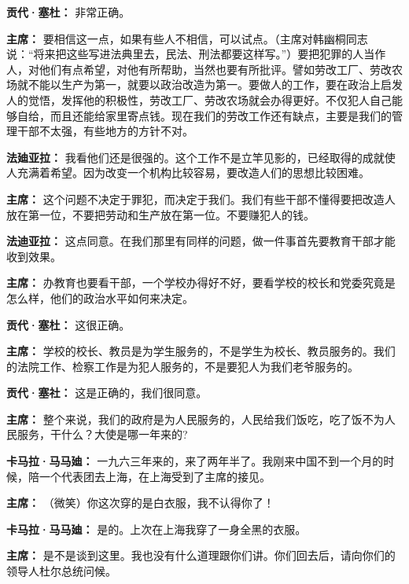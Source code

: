 \begin{duihua}
\item[\textbf{贡代·塞杜：}] 非常正确。

\item[\textbf{主席：}] 要相信这一点，如果有些人不相信，可以试点。（主席对韩幽桐同志说：“将来把这些写进法典里去，民法、刑法都要这样写。”）要把犯罪的人当作人，对他们有点希望，对他有所帮助，当然也要有所批评。譬如劳改工厂、劳改农场就不能以生产为第一，就要以政治改造为第一。要做人的工作，要在政治上启发人的觉悟，发挥他的积极性，劳改工厂、劳改农场就会办得更好。不仅犯人自己能够自给，而且还能给家里寄点钱。现在我们的劳改工作还有缺点，主要是我们的管理干部不太强，有些地方的方针不对。

\item[\textbf{法廸亚拉：}] 我看他们还是很强的。这个工作不是立竿见影的，已经取得的成就使人充满着希望。因为改变一个机构比较容易，要改造人们的思想比较困难。

\item[\textbf{主席：}] 这个问题不决定于罪犯，而决定于我们。我们有些干部不懂得要把改造人放在第一位，不要把劳动和生产放在第一位。不要赚犯人的钱。

\item[\textbf{法迪亚拉：}] 这点同意。在我们那里有同样的问题，做一件事首先要教育干部才能收到效果。

\item[\textbf{主席：}] 办教育也要看干部，一个学校办得好不好，要看学校的校长和党委究竟是怎么样，他们的政治水平如何来决定。

\item[\textbf{贡代·塞杜：}] 这很正确。

\item[\textbf{主席：}] 学校的校长、教员是为学生服务的，不是学生为校长、教员服务的。我们的法院工作、检察工作是为犯人服务的，不是要犯人为我们老爷服务的。

\item[\textbf{贡代·塞社：}] 这是正确的，我们很同意。

\item[\textbf{主席：}] 整个来说，我们的政府是为人民服务的，人民给我们饭吃，吃了饭不为人民服务，干什么？大使是哪一年来的?

\item[\textbf{卡马拉·马马廸：}] 一九六三年来的，来了两年半了。我刚来中国不到一个月的时候，陪一个代表团去上海，在上海受到了主席的接见。

\item[\textbf{主席：}] （微笑）你这次穿的是白衣服，我不认得你了！

\item[\textbf{卡马拉·马马廸：}] 是的。上次在上海我穿了一身全黑的衣服。

\item[\textbf{主席：}] 是不是谈到这里。我也没有什么道理跟你们讲。你们回去后，请向你们的领导人杜尔总统问候。
\end{duihua}
